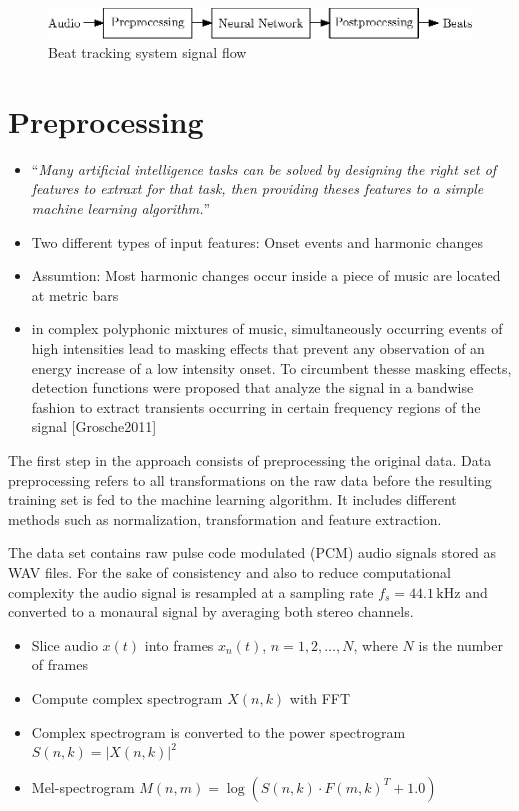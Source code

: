\documentclass{article}
\begin{document}
\begin{figure}[htbp]
\centering
\includegraphics[scale=1.0]{figures/beat_tracking_system.eps}
\caption{Beat tracking system signal flow}
\label{fig:}
\end{figure}	

\section{Preprocessing}

\begin{itemize}
\item ``\emph{Many artificial intelligence tasks can be solved by designing the right set of features to extraxt for that task, then providing theses features to a simple machine learning algorithm.}'' \cite[Goodfellow2016]{Goodfellow2016}
\item Two different types of input features: Onset events and harmonic changes
\item Assumtion: Most harmonic changes occur inside a piece of music are located at metric bars \cite[Khadkevich2012]{Khadkevich2012}
\item in complex polyphonic mixtures of music, simultaneously occurring events of high intensities lead to masking effects that prevent any observation of an energy increase of a low intensity onset. To circumbent thesse masking effects, detection functions were proposed that analyze the signal in a bandwise fashion to extract transients occurring in certain frequency regions of the signal [Grosche2011]
\end{itemize}



The first step in the approach consists of preprocessing the original data. Data preprocessing refers to all transformations on the raw data before the resulting training set is fed to the machine learning algorithm. It includes different methods such as normalization, transformation and feature extraction. 

The data set contains raw pulse code modulated (PCM) audio signals stored as WAV files. For the sake of consistency and also to reduce computational complexity the audio signal is resampled at a sampling rate $f_s = 44.1 \,\text{kHz}$ and converted to a monaural signal by averaging both stereo channels. 


\begin{itemize}
\item Slice audio $x(t)$ into frames $x_n(t)$, $n = 1, 2,\dots, N$, where $N$ is the number of frames
\item Compute complex spectrogram $X(n,k)$ with FFT 
\item Complex spectrogram is converted to the power spectrogram $S(n, k) = |X(n, k)|^2$
\item Mel-spectrogram $M(n,m) = \log \left( S(n,k) \cdot F(m,k)^T + 1.0 \right)$
\end{itemize}
\vspace{1em}
\end{document}
